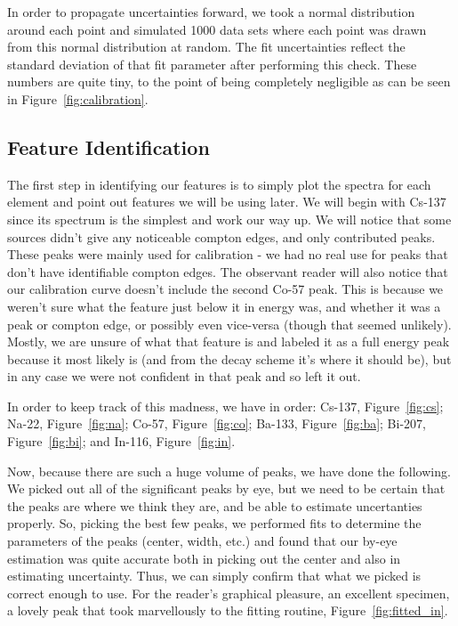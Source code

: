 \documentclass[reprint, nobibnotes, amssymb, amsmath, amsfonts, physics, mathtools, mathrsfs, floatfix]{revtex4-1}
\begin{document}
      In order to propagate uncertainties forward, we took a normal distribution around each point and simulated 1000 data sets where each point was drawn from this normal distribution at random.  The fit uncertainties reflect the standard deviation of that fit parameter after performing this check.  These numbers are quite tiny, to the point of being completely negligible as can be seen in Figure~\ref{fig:calibration}.

    \subsection{Feature Identification}
      The first step in identifying our features is to simply plot the spectra for each element and point out features we will be using later.  We will begin with Cs-137 since its spectrum is the simplest and work our way up.  We will notice that some sources didn't give any noticeable compton edges, and only contributed peaks.  These peaks were mainly used for calibration - we had no real use for peaks that don't have identifiable compton edges.  The observant reader will also notice that our calibration curve doesn't include the second Co-57 peak.  This is because we weren't sure what the feature just below it in energy was, and whether it was a peak or compton edge, or possibly even vice-versa (though that seemed unlikely).  Mostly, we are unsure of what that feature is and labeled it as a full energy peak because it most likely is (and from the decay scheme it's where it should be), but in any case we were not confident in that peak and so left it out.

      In order to keep track of this madness, we have in order: Cs-137, Figure~\ref{fig:cs}; Na-22, Figure~\ref{fig:na}; Co-57, Figure~\ref{fig:co}; Ba-133, Figure~\ref{fig:ba}; Bi-207, Figure~\ref{fig:bi}; and In-116, Figure~\ref{fig:in}.

      \hspace{.25cm}

      Now, because there are such a huge volume of peaks, we have done the following.  We picked out all of the significant peaks by eye, but we need to be certain that the peaks are where we think they are, and be able to estimate uncertanties properly.  So, picking the best few peaks, we performed fits to determine the parameters of the peaks (center, width, etc.) and found that our by-eye estimation was quite accurate both in picking out the center and also in estimating uncertainty.  Thus, we can simply confirm that what we picked is correct enough to use.  For the reader's graphical pleasure, an excellent specimen, a lovely peak that took marvellously to the fitting routine, Figure~\ref{fig:fitted_in}.
\end{document}
